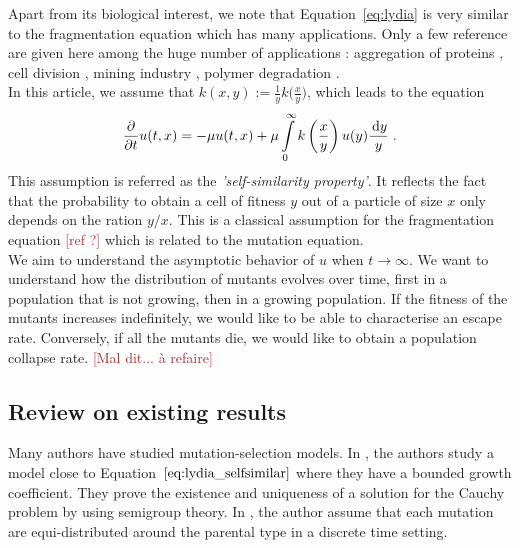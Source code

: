 \documentclass[11pt]{amsart}
\newcommand{\f}{\frac}
\newcommand{\diff}{\,\mathrm{d}}
\newcommand{\ndr}[1]{\textcolor{brown}{[#1]}}
\begin{document}
Apart from its biological interest, we note that Equation~\eqref{eq:lydia} is very similar to the fragmentation equation which has many applications. Only a few reference are given here among the huge number of applications : aggregation of proteins \cite{xue2013imaging}, cell division \cite{doumic2013estimating}, mining industry \cite{kolmogorov1941logarithmic, bertoin2005fragmentation}, polymer degradation \cite{montroll1940theory,ziff1985kinetics}. \\

In this article, we assume that $k(x,y) := \f{1}{y}k \big(\frac{x}{y}\big)$, which leads to the equation
\begin{equation}
    \f{\partial}{\partial t} u(t,x) = - \mu u(t,x) + \mu \int\limits_0^\infty k\left(\frac{x}{y}\right) u(y) \f{\diff y}{y} 
    \eqfinp
    \label{eq:lydia_selfsimilar}
\end{equation}
This assumption is referred as the \textit{'self-similarity property'}. It reflects the fact that the probability to obtain a cell of fitness $y$ out of a particle of size $x$ only depends on the ration $y/x$. This is a classical assumption for the fragmentation equation \ndr{ref ?} which is related to the mutation equation. \\
    
We aim to understand the asymptotic behavior of $u$ when $t \to \infty$. We want to understand how the distribution of mutants evolves over time, first in a population that is not growing, then in a growing population. If the fitness of the mutants increases indefinitely, we would like to be able to characterise an escape rate. Conversely, if all the mutants die, we would like to obtain a population collapse rate. \ndr{Mal dit... à refaire}
    
\subsection{Review on existing results} \mbox{}

Many authors have studied mutation-selection models. 
In \cite{burger1996stationary}, the authors study a model close to Equation~$\eqref{eq:lydia_selfsimilar}$ where they have a bounded growth coefficient.  They prove the existence and uniqueness of a solution for the Cauchy problem by using semigroup theory.
In \cite{eshel1972evolution}, the author assume that each mutation are equi-distributed around the parental type in a discrete time setting. \\ 
\end{document}

